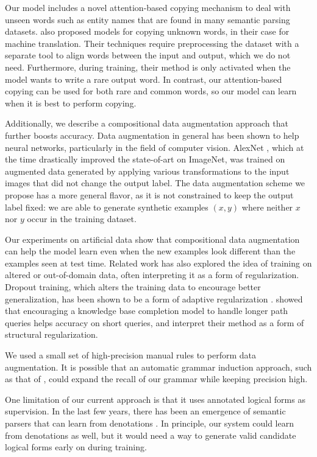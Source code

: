 \documentclass[11pt,letterpaper]{article}
\begin{document}
Our model includes a novel attention-based copying mechanism
to deal with unseen words such as entity names that are found in many semantic parsing datasets.
 also proposed models for copying
unknown words, in their case for machine translation. 
Their techniques require preprocessing the dataset
with a separate tool to align words between the input and output,
which we do not need.
Furthermore, during training, their method is only activated when the model
wants to write a rare output word. 
In contrast, our attention-based copying can be used for 
both rare and common words,
so our model can learn when it is best to perform copying.

Additionally, we describe a compositional data augmentation approach that 
further boosts accuracy.
Data augmentation in general has been shown to help neural networks,
particularly in the field of computer vision.
AlexNet \cite{krizhevsky2012imagenet}, 
which at the time drastically improved
the state-of-art on ImageNet,
was trained on augmented data generated by applying various transformations
to the input images that did not change the output label.
The data augmentation scheme we propose has a more general flavor,
as it is not constrained to keep the output label fixed:
we are able to generate synthetic examples $(x, y)$
where neither $x$ nor $y$ occur in the training dataset.

Our experiments on artificial data show that
compositional data augmentation can help the model learn
even when the new examples look different than the examples seen at test time.  
Related work has also explored the idea of training on 
altered or out-of-domain data, often interpreting
it as a form of regularization.
Dropout training, which alters the training data
to encourage better generalization, has
been shown to be a form of adaptive regularization
\cite{hinton2012improving,wager2014altitude}.
showed that encouraging a knowledge base completion model
to handle longer path queries helps accuracy on
short queries, and interpret their method as
a form of structural regularization.

We used a small set of high-precision manual rules to perform data augmentation.
It is possible that an automatic grammar induction approach,
such as that of ,
could expand the recall of our grammar while keeping precision high.

One limitation of our current approach is that it 
uses annotated logical forms as supervision.
In the last few years, there has been an emergence of
semantic parsers that can learn from denotations 
\cite{clarke10world,liang11dcs,berant2013freebase,artzi2013weakly}.
In principle, our system could learn from denotations as well,
but it would need a way to generate valid candidate logical forms
early on during training.
\end{document}
